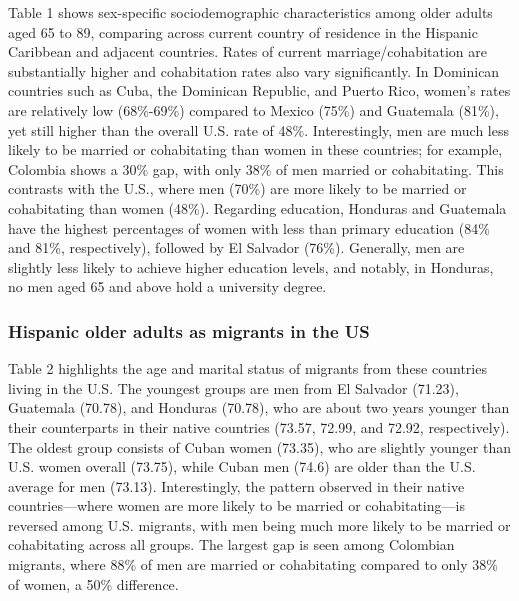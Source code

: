 \documentclass[
]{article}
\begin{document}
Table 1 shows sex-specific sociodemographic characteristics among older
adults aged 65 to 89, comparing across current country of residence in
the Hispanic Caribbean and adjacent countries. Rates of current
marriage/cohabitation are substantially higher and cohabitation rates
also vary significantly. In Dominican countries such as Cuba, the
Dominican Republic, and Puerto Rico, women's rates are relatively low
(68\%-69\%) compared to Mexico (75\%) and Guatemala (81\%), yet still
higher than the overall U.S. rate of 48\%. Interestingly, men are much
less likely to be married or cohabitating than women in these countries;
for example, Colombia shows a 30\% gap, with only 38\% of men married or
cohabitating. This contrasts with the U.S., where men (70\%) are more
likely to be married or cohabitating than women (48\%). Regarding
education, Honduras and Guatemala have the highest percentages of women
with less than primary education (84\% and 81\%, respectively), followed
by El Salvador (76\%). Generally, men are slightly less likely to
achieve higher education levels, and notably, in Honduras, no men aged
65 and above hold a university degree.

\subsubsection{Hispanic older adults as migrants in the
US}\label{hispanic-older-adults-as-migrants-in-the-us}

Table 2 highlights the age and marital status of migrants from these
countries living in the U.S. The youngest groups are men from El
Salvador (71.23), Guatemala (70.78), and Honduras (70.78), who are about
two years younger than their counterparts in their native countries
(73.57, 72.99, and 72.92, respectively). The oldest group consists of
Cuban women (73.35), who are slightly younger than U.S. women overall
(73.75), while Cuban men (74.6) are older than the U.S. average for men
(73.13). Interestingly, the pattern observed in their native
countries---where women are more likely to be married or
cohabitating---is reversed among U.S. migrants, with men being much more
likely to be married or cohabitating across all groups. The largest gap
is seen among Colombian migrants, where 88\% of men are married or
cohabitating compared to only 38\% of women, a 50\% difference.
\end{document}
